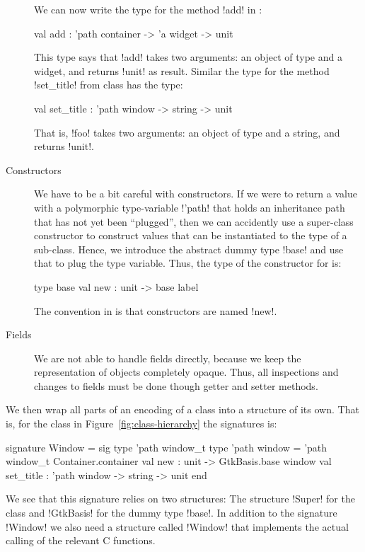 \documentclass[workingdraft]{usetex-v1}
\begin{document}
\begin{description}
  We can now write the type for the method !add! in
  :
\begin{SMLcode}
val add : 'path container -> 'a widget 
                               -> unit
\end{SMLcode}
This type says that !add! takes two arguments: an object of type
 and a widget, and returns !unit! as result.
Similar the type for the method !set_title! from class
 has the type:
\begin{SMLcode}
val set_title : 'path window -> string 
                               -> unit
\end{SMLcode}
That is, !foo! takes two arguments: an object of type 
 and a string, and returns !unit!.


\item[Constructors] We have to be a bit careful with constructors.  If
  we were to return a value with a polymorphic type-variable !'path!
  that holds an inheritance path that has not yet been ``plugged'',
  then we can accidently use a super-class constructor to construct
  values that can be instantiated to the type of a sub-class.  Hence,
  we introduce the abstract dummy type !base! and use that to plug the
  type variable.  Thus, the type of the constructor for
   is:
\begin{SMLcode}
type base
val new : unit -> base label
\end{SMLcode}
The convention in \gtk is that constructors are named !new!.

\item[Fields] We are not able to handle fields directly, because we
  keep the representation of objects completely opaque.  Thus, all
  inspections and changes to fields must be done though getter and
  setter methods.


\end{description}

We then wrap all parts of an encoding of a class into a structure of
its own.  That is, for the class  in
Figure~\ref{fig:class-hierarchy} the \sml signatures is:
\begin{SMLcode}
signature Window =
sig
  type 'path window_t
  type 'path window = 
         'path window_t Container.container
  val new : unit 
            -> GtkBasis.base window
  val set_title : 'path window -> string 
                                 -> unit
end
\end{SMLcode}
We see that this signature relies on two structures: The structure
!Super! for the class  and !GtkBasis! for the dummy
type !base!.  In addition to the signature !Window! we also need a
structure called !Window! that implements the actual calling of the
relevant \gtk C functions.
\end{document}
